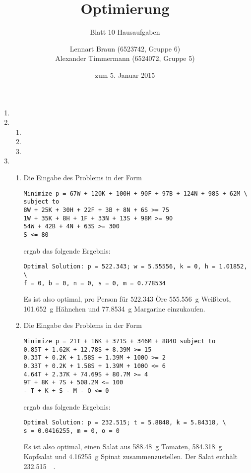 \documentclass[a4paper]{scrartcl}
\title{Optimierung}
\subtitle{Blatt 10 Hausaufgaben}
\author{
	Lennart Braun (6523742, Gruppe 6) \\
    Alexander Timmermann (6524072, Gruppe 5)
}
\date{zum 5. Januar 2015}
\begin{document}
\maketitle

\begin{enumerate}[label=\bfseries\arabic*.]
    \item

    \item
        \begin{enumerate}
            \item

            \item

            \item

        \end{enumerate}

    \item
        \begin{enumerate}
            \item
                Die Eingabe des Problems in der Form
                \begin{verbatim}
Minimize p = 67W + 120K + 100H + 90F + 97B + 124N + 98S + 62M \
subject to
8W + 25K + 30H + 22F + 3B + 8N + 6S >= 75
1W + 35K + 8H + 1F + 33N + 13S + 98M >= 90
54W + 42B + 4N + 63S >= 300
S <= 80 \end{verbatim}
                ergab das folgende Ergebnis:
                \begin{verbatim}
Optimal Solution: p = 522.343; w = 5.55556, k = 0, h = 1.01852, \
f = 0, b = 0, n = 0, s = 0, m = 0.778534 \end{verbatim}
                Es ist also optimal, pro Person für $522.343$ Öre
                \SI{555,556}{\gram} Weißbrot, \SI{101,652}{\gram} Hähnchen
                und \SI{77,8534}{\gram} Margarine einzukaufen.

            \item
                Die Eingabe des Problems in der Form
                \begin{verbatim}
Minimize p = 21T + 16K + 371S + 346M + 884O subject to
0.85T + 1.62K + 12.78S + 8.39M >= 15
0.33T + 0.2K + 1.58S + 1.39M + 100O >= 2
0.33T + 0.2K + 1.58S + 1.39M + 100O <= 6
4.64T + 2.37K + 74.69S + 80.7M >= 4
9T + 8K + 7S + 508.2M <= 100
- T + K + S - M - O <= 0 \end{verbatim}
                ergab das folgende Ergebnis:
                \begin{verbatim}
Optimal Solution: p = 232.515; t = 5.8848, k = 5.84318, \
s = 0.0416255, m = 0, o = 0 \end{verbatim}
                Es ist also optimal, einen Salat aus \SI{588,48}{\gram} Tomaten,
                \SI{584,318}{\gram} Kopfsalat und \SI{4,16255}{\gram} Spinat
                zusammenzustellen.
                Der Salat enthält \SI{232,515}{\kilo\calorie}.


\end{enumerate}
\end{enumerate}
\end{document}
